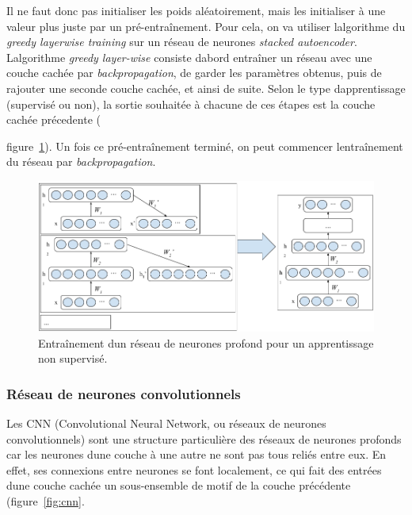 \documentclass[11pt,final,ENIB]{sdm}
\begin{document}
			Il ne faut donc pas initialiser les poids al\'eatoirement, mais les initialiser \`a une valeur plus juste par un pr\'e-entra\^inement. Pour cela, on va utiliser l\textquotesingle algorithme du \textit{greedy layerwise training} sur un r\'eseau de neurones \textit{stacked autoencoder}. 
			L\textquotesingle algorithme \textit{greedy layer-wise} consiste d\textquotesingle abord entra\^iner un r\'eseau avec une couche cach\'ee par \textit{backpropagation}, de garder les param\`etres obtenus, puis de rajouter une seconde couche cach\'ee, et ainsi de suite.
			Selon le type d\textquotesingle apprentissage (supervis\'e ou non), la sortie souhait\'ee \`a chacune de ces \'etapes est la couche cach\'ee pr\'ecedente ({figure~\ref{fig:pretrainingDeepNet}). Un fois ce pr\'e-entra\^inement termin\'e, on peut commencer l\textquotesingle entra\^inement du r\'eseau par \textit{backpropagation}.

			\begin{figure}[!ht]
				\centering
				\includegraphics[scale=0.4,natwidth=919,natheight=412]{figures/trainDeepNetByGreedyLayerWiseUnsupervised.png}
				\caption{Entra\^inement d\textquotesingle un r\'eseau de neurones profond pour un apprentissage non supervis\'e.}
				\label{fig:pretrainingDeepNet}
			\end{figure}

		\subsubsection{R\'eseau de neurones convolutionnels}
		\label{seq:CNN}
			Les CNN (Convolutional Neural Network, ou r\'eseaux de neurones convolutionnels) sont une structure particuli\`ere des r\'eseaux de neurones profonds car les neurones d\textquotesingle une couche \`a une autre ne sont pas tous reli\'es entre eux. En effet, ses connexions entre neurones se font localement, ce qui fait des entr\'ees d\textquotesingle une couche cach\'ee un sous-ensemble de motif de la couche pr\'ec\'edente (figure~\ref{fig:cnn}.

}
\end{document}
